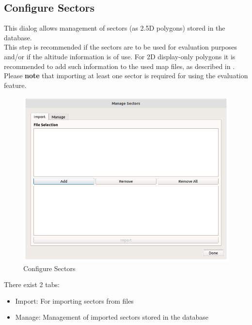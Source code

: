 \subsection{Configure Sectors}
\label{sec:ui_configure_sectors}

This dialog allows management of sectors (as 2.5D polygons) stored in the database. \\

This step is recommended if the sectors are to be used for evaluation purposes and/or if the altitude information is of use. 
For 2D display-only polygons it is recommended to add such information to the used map files, as described in . \\

Please \textbf{note} that importing at least one sector is required for using the evaluation feature.

\begin{figure}[H]
  \center
    \hspace*{-0.5cm}
    \includegraphics[width=15cm]{figures/configure_sectors.png}
  \caption{Configure Sectors}
\end{figure}

There exist 2 tabs:

\begin{itemize}
\item Import: For importing sectors from files
\item Manage: Management of imported sectors stored in the database
\end{itemize}
\ \\

